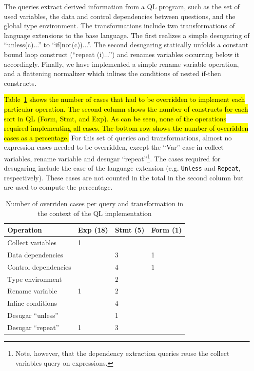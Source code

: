 The queries extract derived information from a QL program, such as the set of used variables, the data and control dependencies between questions, and the global type environment.
The transformations include two transformations of language extensions to the base language.
The first realizes a simple desugaring of ``unless(c){...}'' to ``if(not(c)){...}''.
The second desugaring statically unfolds a constant bound loop construct (``repeat (i){...}'') and renames variables occurring below it accordingly.
Finally, we have implemented a simple rename variable operation, and a flattening normalizer which inlines the conditions of nested if-then constructs.

\hl{Table~\ref{TBL:qlresults} shows the number of cases that had to be overridden to implement each particular operation. The second column shows the number of  constructs for each sort in QL (Form, Stmt, and Exp).
As can be seen, none of the operations required implementing all cases.
The bottom row shows the number of overridden cases as a percentage.}
For this set of queries and transformations, almost no expression cases needed to be overridden, except the ``Var'' case in collect variables, rename variable and desugar ``repeat''\footnote{Note, however, that the dependency extraction queries reuse the collect variables query on expressions.}.
The cases required for desugaring include the case of the language extension (e.g. \lstinline{Unless} and \lstinline{Repeat}, respectively). These cases are not counted in the total in the second column but are used to compute the percentage.

\begin{table}[t]
  \centering
  \begin{tabular}{@{}llll@{}}\toprule
    Operation            & Exp (18) & Stmt (5) & Form (1) \\\hline
    Collect variables    & 1        &          &          \\
    Data dependencies    &          & 3        & 1        \\
    Control dependencies &          & 4        & 1        \\
    Type environment     &          & 2        &          \\\hline
    Rename variable      & 1        & 2        &          \\
    Inline conditions    &          & 4        &          \\
    Desugar ``unless''   &          & 1        &          \\
    Desugar ``repeat''   & 1        & 3        &          \\\bottomrule
  \end{tabular}
\nocaptionrule   \caption{Number of overriden cases per query and transformation in
    the context of the QL implementation\label{TBL:qlresults}}
\end{table}

